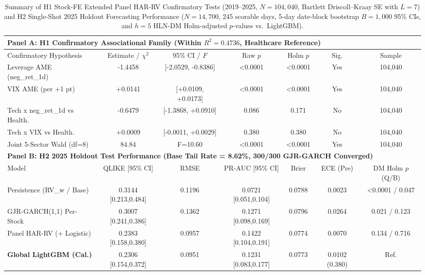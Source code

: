 \documentclass[11pt,a4paper]{article}
\begin{document}
\begin{table}[!t]
\centering
\caption{Summary of H1 Stock-FE Extended Panel HAR-RV Confirmatory Tests (2019--2025, $N=104{,}040$, Bartlett Driscoll--Kraay SE with $L=7$) and H2 Single-Shot 2025 Holdout Forecasting Performance ($N=14{,}700$, 245 scorable days, 5-day date-block bootstrap $B=1{,}000$ 95\% CIs, and $h=5$ HLN-DM Holm-adjusted $p$-values vs.\ LightGBM).}
\label{tab:main_summary}
\scriptsize
\setlength{\tabcolsep}{3.5pt}
\renewcommand{\arraystretch}{1.12}
\begin{tabular}{lcccccc}
\toprule
\multicolumn{7}{l}{\textbf{Panel A: H1 Confirmatory Associational Family (Within $R^2 = 0.4736$, Healthcare Reference)}} \\
\midrule
Confirmatory Hypothesis & Estimate / $\chi^2$ & 95\% CI / $F$ & Raw $p$ & Holm $p$ & Sig. & Sample \\
\midrule
Leverage AME (neg\_ret\_1d) & -1.4458 & [-2.0529, -0.8386] & <0.0001 & <0.0001 & Yes & 104,040 \\
VIX AME (per +1 pt) & +0.0141 & [+0.0109, +0.0173] & <0.0001 & <0.0001 & Yes & 104,040 \\
Tech x neg\_ret\_1d vs Health. & -0.6479 & [-1.3868, +0.0910] & 0.086 & 0.171 & No & 104,040 \\
Tech x VIX vs Health. & +0.0009 & [-0.0011, +0.0029] & 0.380 & 0.380 & No & 104,040 \\
Joint 5-Sector Wald (df=8) & 84.84 & F=10.60 & <0.0001 & <0.0001 & Yes & 104,040 \\
\midrule
\multicolumn{7}{l}{\textbf{Panel B: H2 2025 Holdout Test Performance (Base Tail Rate = 8.62\%, 300/300 GJR-GARCH Converged)}} \\
\midrule
Model & QLIKE [95\% CI] & RMSE & PR-AUC [95\% CI] & Brier & ECE (Pre) & DM Holm $p$ (Q/B) \\
\midrule
Persistence (RV\_w / Base) & 0.3144 [0.213,0.484] & 0.1196 & 0.0721 [0.051,0.104] & 0.0788 & 0.0023 & <0.0001 / 0.047 \\
GJR-GARCH(1,1) Per-Stock & 0.3007 [0.241,0.386] & 0.1362 & 0.1271 [0.098,0.169] & 0.0796 & 0.0264 & 0.021 / 0.123 \\
Panel HAR-RV (+ Logistic) & 0.2383 [0.158,0.380] & 0.0957 & 0.1422 [0.104,0.191] & 0.0774 & 0.0070 & 0.134 / 0.716 \\
\textbf{Global LightGBM (Cal.)} & 0.2306 [0.154,0.372] & 0.0951 & 0.1231 [0.083,0.177] & 0.0773 & 0.0102 (0.380) & Ref. \\
\bottomrule
\end{tabular}
\end{table}
\end{document}

